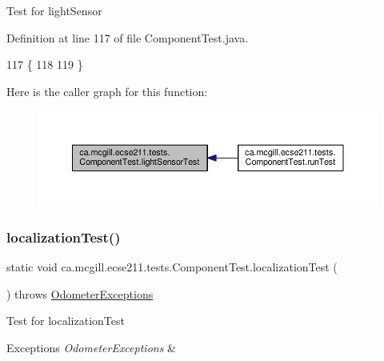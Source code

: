Test for light\+Sensor 

Definition at line 117 of file Component\+Test.\+java.


\begin{DoxyCode}
117                                        \{
118 
119   \}
\end{DoxyCode}
Here is the caller graph for this function\+:\nopagebreak
\begin{figure}[H]
\begin{center}
\leavevmode
\includegraphics[width=350pt]{enumca_1_1mcgill_1_1ecse211_1_1tests_1_1_component_test_a3e8288f482b3806a0f3c4668951f3e36_icgraph}
\end{center}
\end{figure}
\mbox{\label{enumca_1_1mcgill_1_1ecse211_1_1tests_1_1_component_test_ad11712dd74c5c64e84cd71186a59a087}} 
\subsubsection{\texorpdfstring{localization\+Test()}{localizationTest()}}
{\footnotesize\ttfamily static void ca.\+mcgill.\+ecse211.\+tests.\+Component\+Test.\+localization\+Test (\begin{DoxyParamCaption}{ }\end{DoxyParamCaption}) throws \hyperlink{classca_1_1mcgill_1_1ecse211_1_1odometer_1_1_odometer_exceptions}{Odometer\+Exceptions}\hspace{0.3cm}{\ttfamily [static]}}

Test for localization\+Test


\begin{DoxyExceptions}{Exceptions}
{\em Odometer\+Exceptions} & \\
\hline
\end{DoxyExceptions}


